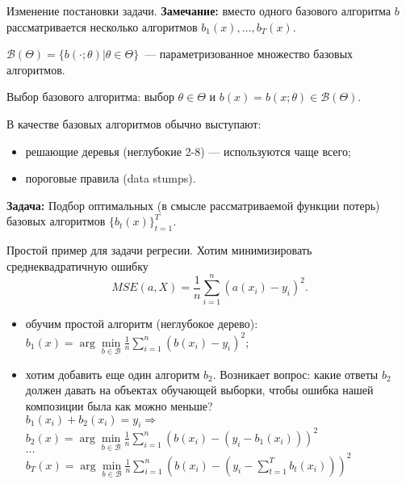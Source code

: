 \documentclass[10pt,unicode,notheorems]{beamer}
\begin{document}
\begin{frame}{Изменение постановки задачи.}
   \textbf{Замечание:} вместо одного базового алгоритма $b$ рассматривается несколько алгоритмов $b_1(x), \ldots , b_T (x)$.
\vspace{0.2cm}

$\mathcal{B}(\Theta) = \{b(\cdot;\theta)|\theta \in \Theta \}$~---  параметризованное множество базовых алгоритмов.
\vspace{0.2cm}

Выбор базового алгоритма: выбор $\theta \in \Theta$ и $b(x)=b(x;\theta) \in \mathcal{B}(\Theta)$.
\vspace{0.2cm}

В качестве базовых алгоритмов обычно выступают:
\begin{itemize}
    \item решающие деревья (неглубокие 2-8) — используются чаще всего;
    \item пороговые правила (data stumps).
\end{itemize}
\vspace{0.2cm}

\textbf{Задача:} Подбор оптимальных (в смысле рассматриваемой функции потерь) базовых алгоритмов $\{b_t(x)\}_{t=1}^T$.
\end{frame}

\begin{frame}{Простой пример для задачи регресии.}
Хотим минимизировать среднеквадратичную ошибку
$$MSE(a,X) = \frac{1}{n} \sum \limits_{i=1}^n (a(x_i)-y_i)^2.$$
\begin{itemize}
    \item обучим простой алгоритм (неглубокое дерево): $b_1(x) = \arg \min \limits_{b \in \mathcal{B}} \frac{1}{n} \sum \limits_{i=1}^n (b(x_i)-y_i)^2$;
    \item хотим добавить еще один алгоритм $b_2$. Возникает вопрос: какие ответы $b_2$ должен давать на объектах обучающей выборки, чтобы ошибка нашей композиции была как можно меньше? \\
    \vspace{0.2cm}
    $b_1(x_i) + b_2(x_i) = y_i \Rightarrow $ \\
    \vspace{0.2cm}
    $b_2(x) = \arg \min \limits_{b \in \mathcal{B}} \frac{1}{n} \sum \limits_{i=1}^n (b(x_i)- (y_i-b_1(x_i)))^2$ \\
    $\ldots$ \\
    $b_T(x) = \arg \min \limits_{b \in \mathcal{B}} \frac{1}{n} \sum \limits_{i=1}^n (b(x_i)- (y_i- \sum \limits_{t=1}^T b_t(x_i)))^2$
\end{itemize}
\end{frame}   
\end{document}
